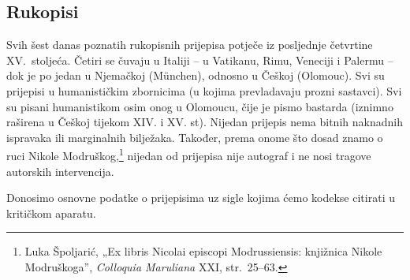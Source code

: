 \documentclass[a5paper,twoside]{article}
\begin{document}
\subsection{Rukopisi}

Svih šest danas poznatih rukopisnih prijepisa potječe iz posljednje četvrtine XV.~stoljeća. Četiri se čuvaju u Italiji – u Vatikanu, Rimu, Veneciji i Palermu – dok je po jedan u Njemačkoj (München), odnosno u Češkoj (Olomouc). Svi su prijepisi u humanističkim zbornicima (u kojima prevladavaju prozni sastavci). Svi su pisani humanistikom osim onog u Olomoucu, čije je pismo bastarda (iznimno raširena u Češkoj tijekom XIV. i XV. st). Nijedan prijepis nema bitnih naknadnih ispravaka ili marginalnih bilježaka. Također, prema onome što dosad znamo o ruci Nikole Modruškog,\footnote{Luka Špoljarić, „Ex libris Nicolai episcopi Modrussiensis: knjižnica Nikole Modruškoga”, \textit{Colloquia Maruliana} XXI, str.~25–63.} nijedan od prijepisa nije autograf i ne nosi tragove autorskih intervencija.

Donosimo osnovne podatke o prijepisima uz sigle kojima ćemo kodekse citirati u kritičkom aparatu.
\end{document}
